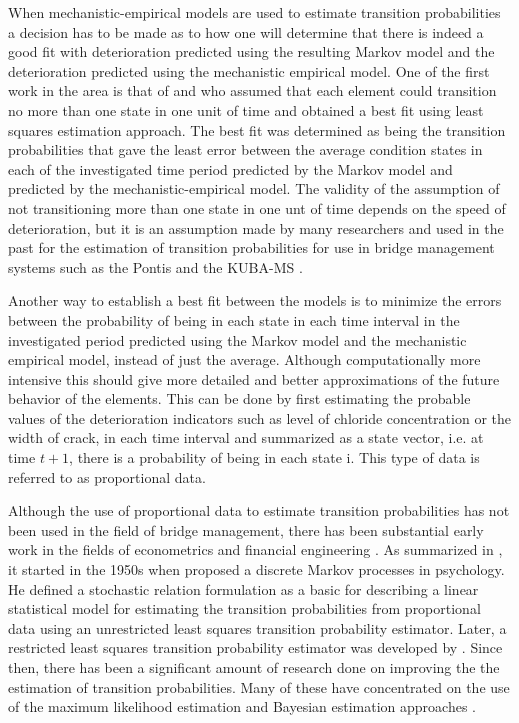 \documentclass[Journal]{ascelike}
\begin{document}
When mechanistic-empirical models are used to estimate transition
probabilities a decision has to be made as to how one will determine
that there is indeed a good fit with deterioration predicted using
the resulting Markov model and the deterioration predicted using the
mechanistic empirical model. One of the first work in the area is
that of  and  who assumed
that each element could transition no more than one state in one unit
of time and obtained a best fit using least squares estimation approach.
The best fit was determined as being the transition probabilities that
gave the least error between the average condition states in each
of the investigated time period predicted by the Markov model and
predicted by the mechanistic-empirical model. The validity of the
assumption of not transitioning more than one state in one unt of
time depends on the speed of deterioration, but it is an assumption
made by many researchers \cite{Jiang1988,Al-Subhi1989,Mishalani2002,Robelin2007}
and used in the past for the estimation of transition probabilities
for use in bridge management systems such as the Pontis \cite{pontis,Soderqvist1998,Thompson1998,Thompson1999a,FHWA2002} and the KUBA-MS \cite{Hajdin2003,Hajdin2006}.

Another way to establish a best fit between the models is to minimize
the errors between the probability of being in each state in each
time interval in the investigated period predicted using the Markov
model and the mechanistic empirical model, instead of just the average.
Although computationally more intensive this should give more detailed
and better approximations of the future behavior of the elements.
This can be done by first estimating the probable values of the deterioration
indicators such as level of chloride concentration or the width of
crack, in each time interval and summarized as a state vector, i.e.
at time $t+1$, there is a probability of being in each state i. This
type of data is referred to as proportional data.

Although the use of proportional data to estimate transition probabilities
has not been used in the field of bridge management, there has been
substantial early work in the fields of econometrics and financial
engineering \cite{Lee1972}. As summarized in , it
started in the 1950s when  proposed a discrete
Markov processes in psychology. He defined a stochastic relation formulation
as a basic for describing a linear statistical model for estimating
the transition probabilities from proportional data using an unrestricted
least squares transition probability estimator. Later, a restricted
least squares transition probability estimator was developed by 
. Since then, there has been a significant amount of research done
on improving the the estimation of transition probabilities. Many
of these have concentrated on the use of the maximum likelihood estimation
and Bayesian estimation approaches \cite{Lee1972,lancaster90,Kobayashi2012}.
\end{document}
